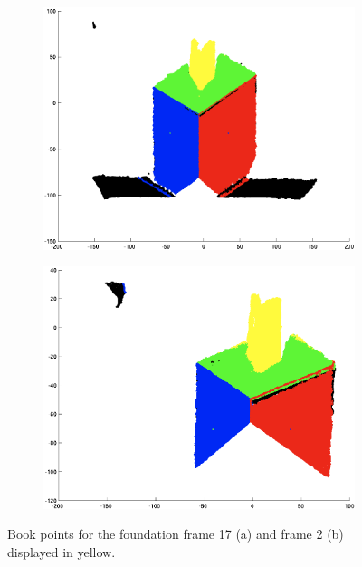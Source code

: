 \begin{figure}[H]
	\centering
	\begin{subfigure}[b]{0.45\textwidth}
		\centering
		\includegraphics[width=\textwidth]{Images/6-BookPoints(1).png}
		\subcaption{}
		\label{fig:bookPoints}
	\end{subfigure}%
	\hspace{1cm}
	\begin{subfigure}[b]{0.45\textwidth}
		\centering
		\includegraphics[width=\textwidth]{Images/6-BookPoints-frame2(1).png}
		\subcaption{}
		\label{fig:bookPointsFrame2}
	\end{subfigure}
	\caption{Book points for the foundation frame 17 (a) and frame 2 (b) displayed in yellow.}
\end{figure}

